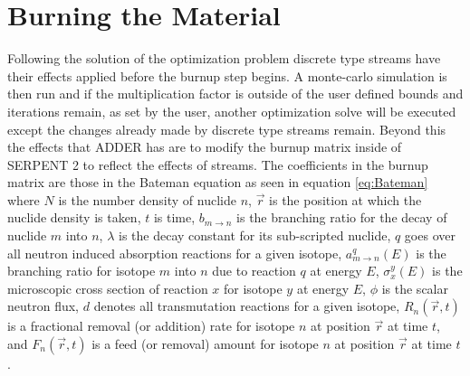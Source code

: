\documentclass[]{elsarticle}
\begin{document}
\section{Burning the Material}
Following the solution of the optimization problem discrete type streams have
their effects applied before the burnup step begins. A monte-carlo simulation is
then run and if the multiplication factor is outside of the user defined bounds
and iterations remain, as set by the user, another optimization solve will be
executed except the changes already made by discrete type streams remain. 
Beyond this the effects that ADDER has are to modify the burnup matrix inside of
SERPENT 2 to reflect the effects of streams. The coefficients in the burnup
matrix are those in the Bateman equation as seen in equation \ref{eq:Bateman}
where $N$ is the number density of nuclide $n$, $\vec{r}$ is the position at
which the nuclide density is taken, $t$ is time, $b_{m \to n}$ is the branching ratio for the decay of nuclide $m$ into $n$, $\lambda$ is the decay constant
for its sub-scripted nuclide,
$q$ goes over all neutron induced absorption reactions for a given isotope, 
$a_{m \to n}^{q}(E)$ is the branching ratio for isotope $m$ into $n$ due to
reaction $q$ at energy $E$,  $\sigma_{x}^{y}(E)$ is the microscopic
cross section of reaction $x$ for isotope $y$ at energy $E$, $\phi$ is the
scalar neutron flux, $d$ denotes all
transmutation reactions for a given isotope, $R_{n}(\vec{r},t)$ is a
fractional removal (or addition) rate for isotope $n$ at position $\vec{r}$ at
time $t$, and $F_{n}(\vec{r},t)$ is a feed (or removal) amount for isotope
$n$ at position $\vec{r}$ at time $t$. 
\end{document}
